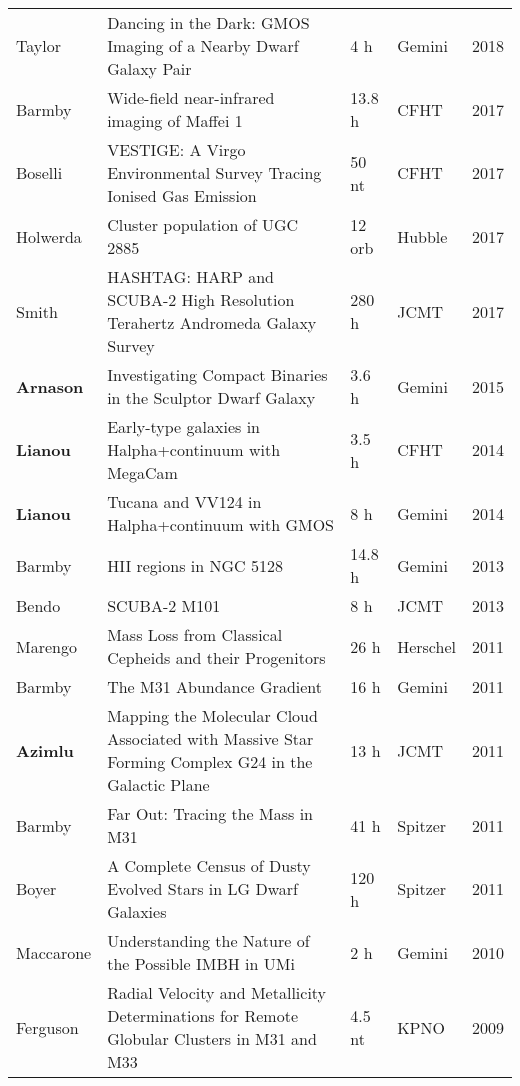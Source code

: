 \begin{tabularx}{\textwidth}{Xp{10cm}XXX}
Taylor & Dancing in the Dark: GMOS Imaging of a Nearby Dwarf Galaxy Pair & 4 h & Gemini & 2018\\
Barmby & Wide-field near-infrared imaging of Maffei 1 & 13.8 h & CFHT & 2017\\
Boselli & VESTIGE: A Virgo Environmental Survey Tracing Ionised Gas Emission & 50 nt & CFHT & 2017\\
Holwerda & Cluster population of UGC 2885 & 12 orb & Hubble & 2017\\
Smith & HASHTAG: HARP and SCUBA-2 High Resolution Terahertz Andromeda Galaxy Survey & 280 h & JCMT & 2017\\
{\bf Arnason} & Investigating Compact Binaries in the Sculptor Dwarf Galaxy & 3.6 h & Gemini & 2015\\
{\bf Lianou} & Early-type galaxies in Halpha+continuum with MegaCam & 3.5 h & CFHT & 2014\\
{\bf Lianou} & Tucana and VV124 in Halpha+continuum with GMOS  & 8 h & Gemini & 2014\\
Barmby & HII regions in NGC 5128 & 14.8 h& Gemini & 2013\\
Bendo & SCUBA-2 M101 & 8 h & JCMT &  2013\\
Marengo & Mass Loss from Classical Cepheids and their Progenitors & 26 h & Herschel & 2011\\
Barmby & The M31 Abundance Gradient & 16 h & Gemini & 2011\\
{\bf Azimlu} & Mapping the Molecular Cloud Associated with Massive Star Forming Complex G24 in the Galactic Plane & 13 h & JCMT & 2011\\
Barmby & Far Out: Tracing the Mass in M31  & 41 h & Spitzer & 2011\\
Boyer & A Complete Census of Dusty Evolved Stars in LG Dwarf Galaxies & 120 h & Spitzer & 2011\\
Maccarone & Understanding the Nature of the Possible IMBH in UMi & 2 h & Gemini & 2010\\
Ferguson & Radial Velocity and Metallicity Determinations for Remote Globular Clusters in M31 and M33 & 4.5 nt & KPNO& 2009\\

\end{tabularx}
